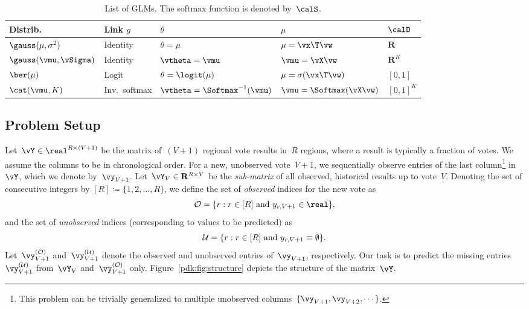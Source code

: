 \begin{table}
	\caption{
		List of GLMs.
		The softmax function is denoted by~$\calS$.
	}
	\label{pdk:tab:glm}
	\begin{tabular}{lllll}
		\toprule
		Distrib.                & Link $g$      & $\theta$                        & $\mu$                      & $\calD$        \\
		\midrule

		$\gauss(\mu, \sigma^2)$ & Identity      & $\theta = \mu$                  & $\mu = \vx\T \vw$          & $\mathbf{R}$   \\
		$\gauss(\vmu, \vSigma)$ & Identity      & $\vtheta = \vmu$                & $\vmu = \vX \vw$           & $\mathbf{R}^K$ \\
		$\ber(\mu)$             & Logit         & $\theta = \logit(\mu)$          & $\mu = \sigma(\vx\T \vw)$  & $[0, 1]$       \\
		$\cat(\vmu, K)$         & Inv.\ softmax & $\vtheta = \Softmax^{-1}(\vmu)$ & $\vmu = \Softmax(\vX \vw)$ & $[0, 1]^K$     \\

		\bottomrule
	\end{tabular}
\end{table}

\subsection{Problem Setup}

Let~$\vY \in \real^{R \times (V+1)}$ be the matrix of~$(V+1)$ regional vote results in~$R$ regions, where a result is typically a fraction of votes.
We assume the columns to be in chronological order.
For a new, unobserved vote~$V+1$, we sequentially observe entries of the last column\footnote{This problem can be trivially generalized to multiple unobserved columns~$\{\vy_{V+1}, \vy_{V+2}, \cdots \}$.} in~$\vY$, which we denote by~$\vy_{V+1}$.
Let~$\vY_V \in \mathbf{R}^{R \times V}$ be the \emph{sub-matrix} of all observed, historical results up to vote~$V$.
Denoting the set of consecutive integers by $[R] \coloneq \{1, 2, \ldots, R \}$, we define the set of \textit{observed} indices for the new vote as
\begin{equation*}
	\Obs = \{ r : r \in [R] \text{ and } y_{r,V+1} \in \real \},
\end{equation*}
and the set of \textit{unobserved} indices (corresponding to values to be predicted) as
\begin{equation*}
	\mathcal{U} = \{ r : r \in [R] \text{ and } y_{r,V+1} \equiv \emptyset \}.
\end{equation*}
Let~$\vy^{(\Obs)}_{V+1}$ and~$\vy^{(\Ubs)}_{V+1}$ denote the observed and unobserved entries of~$\vy_{V+1}$, respectively.
Our task is to predict the missing entries~$\vy^{(\Ubs)}_{V+1}$ from~$\vY_V$ and~$\vy^{(\Obs)}_{V+1}$ only.
Figure~\ref{pdk:fig:structure} depicts the structure of the matrix~$\vY$.

